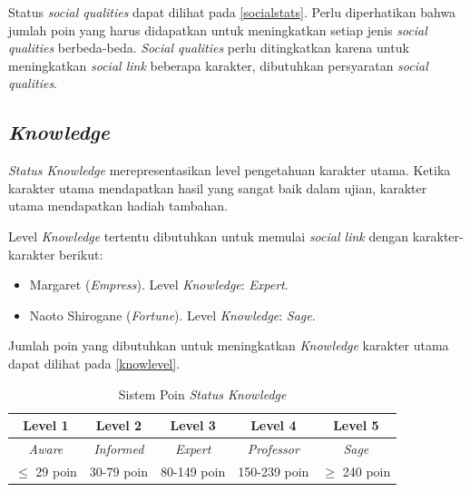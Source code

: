 Status \textit{social qualities} dapat dilihat pada \autoref{socialstats}. Perlu diperhatikan bahwa jumlah poin yang harus didapatkan untuk meningkatkan setiap jenis \textit{social qualities} berbeda-beda. \textit{Social qualities} perlu ditingkatkan karena untuk meningkatkan \textit{social link} beberapa karakter, dibutuhkan persyaratan \textit{social qualities}.

\subsection{\textit{Knowledge}}
\textit{Status Knowledge} merepresentasikan level pengetahuan karakter utama. Ketika karakter utama mendapatkan hasil yang sangat baik dalam ujian, karakter utama mendapatkan hadiah tambahan.

Level \textit{Knowledge} tertentu dibutuhkan untuk memulai \textit{social link} dengan karakter-karakter berikut:
\begin{itemize}
    \item Margaret (\textit{Empress}). Level \textit{Knowledge}: \textit{Expert}.
    \item Naoto Shirogane (\textit{Fortune}). Level \textit{Knowledge}: \textit{Sage}.
\end{itemize}

Jumlah poin yang dibutuhkan untuk meningkatkan \textit{Knowledge} karakter utama dapat dilihat pada \autoref{knowlevel}.
\begin{table}[H]
    \caption{\label{knowlevel}Sistem Poin \textit{Status Knowledge}}
    \begin{center}
        \begin{tabular}{ | c | c | c | c | c | }
            \hline
            \textbf{Level 1} & \textbf{Level 2}  & \textbf{Level 3} & \textbf{Level 4}   & \textbf{Level 5} \\
            \hline
            \textit{Aware}   & \textit{Informed} & \textit{Expert}  & \textit{Professor} & \textit{Sage}    \\
            \hline
            $\le$ 29 poin    & 30-79 poin        & 80-149 poin      & 150-239 poin       & $\ge$ 240 poin   \\
            \hline
        \end{tabular}
    \end{center}
\end{table}

